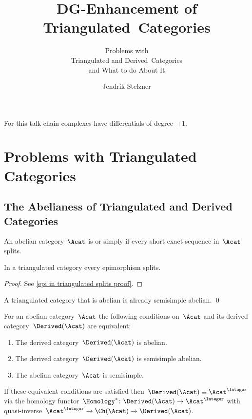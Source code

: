\documentclass[a4paper,10pt]{scrartcl}
\title{DG-Enhancement of Triangulated~Categories}
\subtitle{Problems with \\ Triangulated and Derived~Categories \\ and What to do About It}
\author{Jendrik Stelzner}
\date{}
\begin{document}
\maketitle
  
\vspace{-1em}





For this talk chain complexes have differentials of degree~$+1$.





\section{Problems with Triangulated Categories}



\subsection{The Abelianess of Triangulated and Derived Categories}

\begin{definition}
  An abelian category~$\Acat$ is  or simply  if every short exact sequence in~$\Acat$ splits.
\end{definition}

\begin{lemma}
  \label{epi in triangulated splits}
  In a triangulated category every epimorphism splits.
\end{lemma}

\begin{proof}
  See \cref{epi in triangulated splits proof}.
\end{proof}

\begin{corollary}
  \label{triangulated abelian is semisimple}
  A triangulated category that is abelian is already semisimple abelian.
  \qed
\end{corollary}

\begin{proposition}
  \label{when the derived is abelian}
  For an abelian category~$\Acat$ the following conditions on~$\Acat$ and its derived category~$\Derived(\Acat)$ are equivalent:
  \begin{enumerate}
    \item
      \label{derived is abelian}
      The derived category~$\Derived(\Acat)$ is abelian.
    \item
      \label{derived is semisimple abelian}
      The derived category~$\Derived(\Acat)$ is semisimple abelian.
    \item
      \label{original is semisimple}
      The abelian category~$\Acat$ is semisimple.
  \end{enumerate}
  If these equivalent conditions are satisfied then~$\Derived(\Acat) \equiv \Acat^\Integer$ via the homology functor~$\Homology^* \colon \Derived(\Acat) \to \Acat^\Integer$ with quasi-inverse~$\Acat^\Integer \to \Ch(\Acat) \to \Derived(\Acat)$.
\end{proposition}
\end{document}
